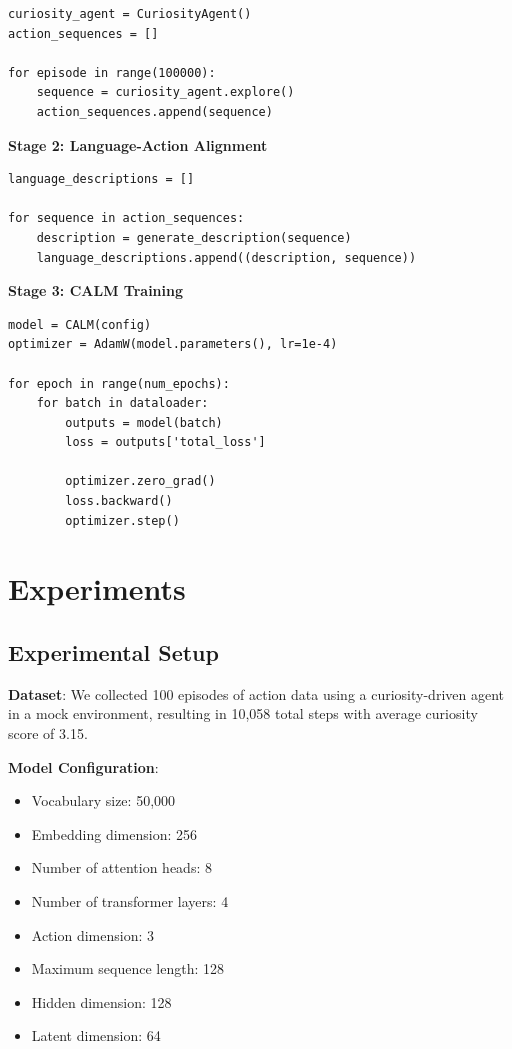 \documentclass{IEEEtran}
\begin{document}
\begin{verbatim}
curiosity_agent = CuriosityAgent()
action_sequences = []

for episode in range(100000):
    sequence = curiosity_agent.explore()
    action_sequences.append(sequence)
\end{verbatim}

\textbf{Stage 2: Language-Action Alignment}

\begin{verbatim}
language_descriptions = []

for sequence in action_sequences:
    description = generate_description(sequence)
    language_descriptions.append((description, sequence))
\end{verbatim}

\textbf{Stage 3: CALM Training}

\begin{verbatim}
model = CALM(config)
optimizer = AdamW(model.parameters(), lr=1e-4)

for epoch in range(num_epochs):
    for batch in dataloader:
        outputs = model(batch)
        loss = outputs['total_loss']
        
        optimizer.zero_grad()
        loss.backward()
        optimizer.step()
\end{verbatim}

\section{Experiments}

\subsection{Experimental Setup}

\textbf{Dataset}: We collected 100 episodes of action data using a curiosity-driven agent in a mock environment, resulting in 10,058 total steps with average curiosity score of 3.15.

\textbf{Model Configuration}:
\begin{itemize}
    \item Vocabulary size: 50,000
    \item Embedding dimension: 256
    \item Number of attention heads: 8
    \item Number of transformer layers: 4
    \item Action dimension: 3
    \item Maximum sequence length: 128
    \item Hidden dimension: 128
    \item Latent dimension: 64
\end{itemize}
\end{document}
